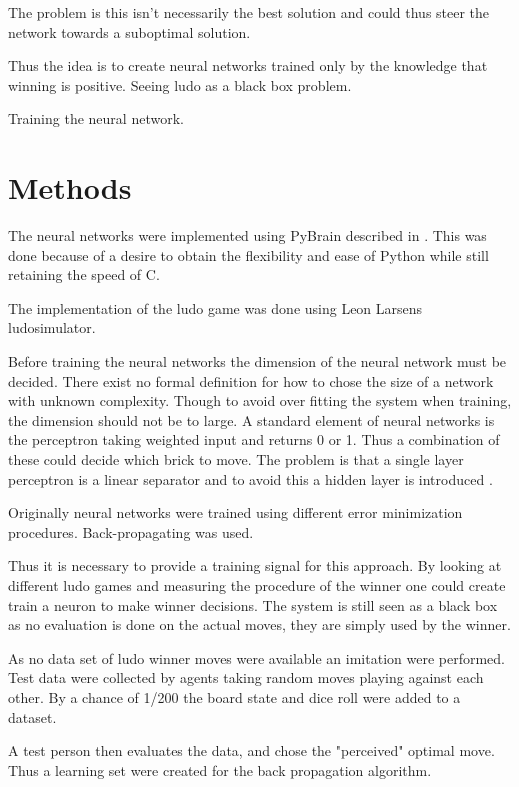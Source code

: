 \documentclass{llncs}
\begin{document}
The problem is  this isn't necessarily the best solution and could thus steer the network towards a suboptimal solution. 



Thus the idea is to create neural networks trained only by the knowledge that winning is positive. Seeing ludo as a black box problem.



Training the neural network.

\section*{Methods} %

The neural networks were implemented using PyBrain described in \cite{schaul2010}. This was done because of a desire to obtain the flexibility and ease of Python while still retaining the speed of C. 

The implementation of the ludo game was done using Leon Larsens ludosimulator.


Before training the neural networks the dimension of the neural network must be decided. There exist no formal definition for how to chose the size of a network with unknown complexity. Though to avoid over fitting the system when training, the dimension should not be to large. A standard element of neural networks is the perceptron taking weighted input and returns 0 or 1. Thus a combination of these could decide which brick to move. The problem is that a single layer perceptron is a linear separator and to avoid this a hidden layer is introduced \cite{Russell}. 

Originally neural networks were trained using different error minimization procedures. 
Back-propagating was used.


Thus it is necessary to provide a training signal for this approach. By looking at different ludo games and measuring the procedure of the winner one could create train a neuron to make winner decisions. The system is still seen as a black box as no evaluation is done on the actual moves, they are simply used by the winner.

As no data set of ludo winner moves were available an imitation were performed. Test data were collected by agents taking random moves playing against each other. By a chance of 1/200 the board state and dice roll were added to a dataset. 

A test person then evaluates the data, and chose the "perceived" optimal move. Thus a learning set were created for the back propagation algorithm.
\end{document}
